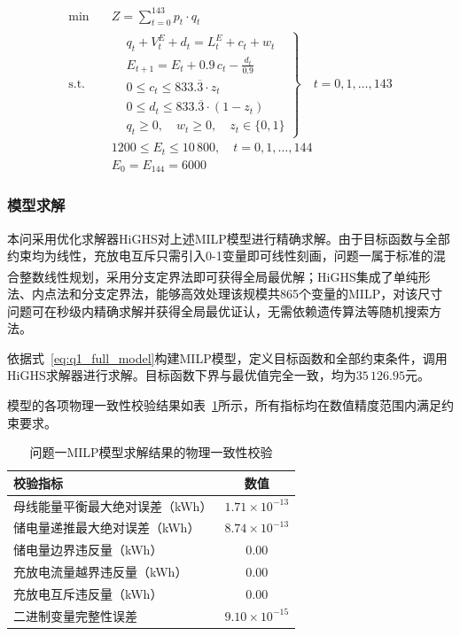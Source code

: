 \documentclass[12pt,a4paper]{ctexart}
\newcommand{\upcite}[1]{\textsuperscript{\cite{#1}}}
\theoremstyle{definition}
\theoremstyle{plain}
\theoremstyle{remark}
\begin{document}
\begin{equation}
\begin{aligned}
  \min \quad & \boxed{Z = \sum_{t=0}^{143} p_t \cdot q_t} \\[6pt]
  \text{s.t.} \quad 
  & \left.
  \begin{aligned}
    & q_t + V_t^{E} + d_t = L_t^{E} + c_t + w_t \\
    & E_{t+1} = E_t + 0.9\,c_t - \frac{d_t}{0.9} \\
    & 0 \leq c_t \leq 833.\overline{3} \cdot z_t \\
    & 0 \leq d_t \leq 833.\overline{3} \cdot (1 - z_t) \\
    & q_t \geq 0, \quad w_t \geq 0, \quad z_t \in \{0, 1\}
  \end{aligned}
  \right\} \quad t = 0, 1, \ldots, 143 \\[6pt]
  & 1200 \leq E_t \leq 10\,800, \quad t = 0, 1, \ldots, 144 \\[4pt]
  & E_0 = E_{144} = 6000
\end{aligned}
\label{eq:q1_full_model}
\end{equation}


\subsubsection{模型求解}

本问采用优化求解器HiGHS对上述MILP模型进行精确求解。由于目标函数与全部约束均为线性，充放电互斥只需引入0-1变量即可线性刻画，问题一属于标准的混合整数线性规划，采用分支定界法\upcite{wolsey1998integer}即可获得全局最优解；HiGHS集成了单纯形法、内点法和分支定界法，能够高效处理该规模共865个变量的MILP，对该尺寸问题可在秒级内精确求解并获得全局最优证认，无需依赖遗传算法等随机搜索方法。

依据式~\eqref{eq:q1_full_model}构建MILP模型，定义目标函数和全部约束条件，调用HiGHS求解器进行求解。目标函数下界与最优值完全一致，均为$35\,126.95$元。

模型的各项物理一致性校验结果如表~\ref{tab:q1_validation}所示，所有指标均在数值精度范围内满足约束要求。

\begin{table}[H]
\centering
\caption{问题一MILP模型求解结果的物理一致性校验}
\label{tab:q1_validation}
\begin{tabular}{lc}
\toprule
\textbf{校验指标} & \textbf{数值} \\
\midrule
母线能量平衡最大绝对误差（kWh）  & $1.71 \times 10^{-13}$ \\
储电量递推最大绝对误差（kWh）    & $8.74 \times 10^{-13}$ \\
储电量边界违反量（kWh）          & $0.00$ \\
充放电流量越界违反量（kWh）      & $0.00$ \\
充放电互斥违反量（kWh）          & $0.00$ \\
二进制变量完整性误差             & $9.10 \times 10^{-15}$ \\
\bottomrule
\end{tabular}
\end{table}
\end{document}
